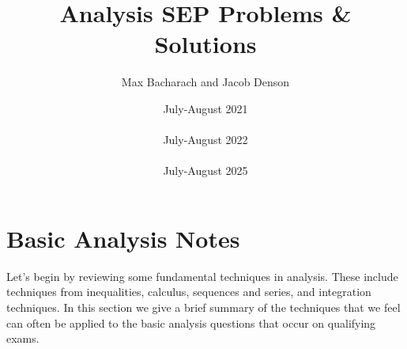 \documentclass[answers]{exam}
\title{Analysis SEP Problems \& Solutions}
\date{July-August 2021\\\text{and}\\July-August 2022\\\text{and}\\July-August 2025}
\author{Max Bacharach and Jacob Denson}
\begin{document}
\maketitle

\tableofcontents

\newpage

\section{Basic Analysis Notes}

Let's begin by reviewing some fundamental techniques in analysis. These include techniques from inequalities, calculus, sequences and series, and integration techniques. In this section we give a brief summary of the techniques that we feel can often be applied to the basic analysis questions that occur on qualifying exams.
\end{document}
